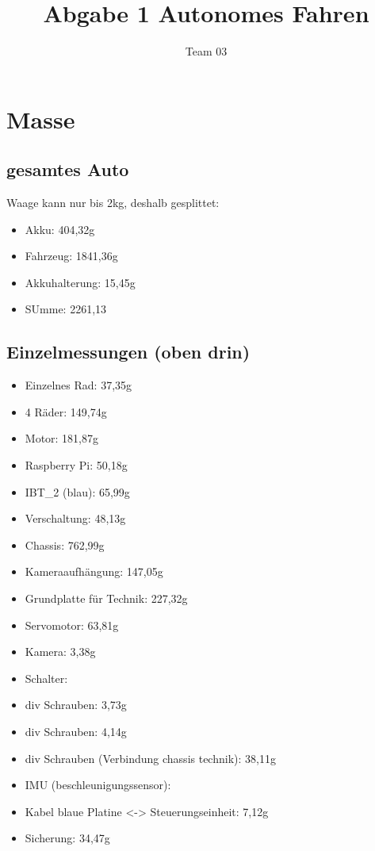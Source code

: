 \documentclass[12pt,final]{article}
\author{Team 03}
\title{Abgabe 1 Autonomes Fahren}
\begin{document}
\maketitle

\tableofcontents

\section{Masse}
    \subsection{gesamtes Auto}
    Waage kann nur bis 2kg, deshalb gesplittet:
    \begin{itemize}
        \item Akku: 404,32g
        \item Fahrzeug: 1841,36g
        \item Akkuhalterung: 15,45g
        \item SUmme: 2261,13
    \end{itemize}

    \subsection{Einzelmessungen (oben drin)}
    \begin{itemize}
        \item Einzelnes Rad: 37,35g
        \item 4 Räder: 149,74g
        \item Motor: 181,87g
        \item Raspberry Pi: 50,18g
        \item IBT\_2 (blau): 65,99g
        \item Verschaltung: 48,13g
        \item Chassis: 762,99g
        \item Kameraaufhängung: 147,05g
        \item Grundplatte für Technik: 227,32g
        \item Servomotor: 63,81g
        \item Kamera: 3,38g
        \item Schalter:
        \item div Schrauben: 3,73g
        \item div Schrauben: 4,14g
        \item div Schrauben (Verbindung chassis technik): 38,11g
        \item IMU (beschleunigungssensor):
        \item Kabel blaue Platine <-> Steuerungseinheit: 7,12g
        \item Sicherung: 34,47g
    \end{itemize}
\end{document}
